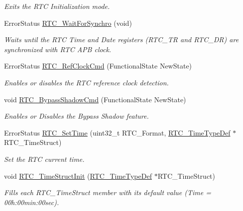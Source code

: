 \begin{DoxyCompactItemize}
\begin{DoxyCompactList}\small\item\em Exits the R\-T\-C Initialization mode. \end{DoxyCompactList}\item 
Error\-Status \hyperlink{group___r_t_c_ga2938febeef6baf0d91cc066ca5caf095}{R\-T\-C\-\_\-\-Wait\-For\-Synchro} (void)
\begin{DoxyCompactList}\small\item\em Waits until the R\-T\-C Time and Date registers (R\-T\-C\-\_\-\-T\-R and R\-T\-C\-\_\-\-D\-R) are synchronized with R\-T\-C A\-P\-B clock. \end{DoxyCompactList}\item 
Error\-Status \hyperlink{group___r_t_c_gaa60079ec257fb3a277d058ca8305533d}{R\-T\-C\-\_\-\-Ref\-Clock\-Cmd} (Functional\-State New\-State)
\begin{DoxyCompactList}\small\item\em Enables or disables the R\-T\-C reference clock detection. \end{DoxyCompactList}\item 
void \hyperlink{group___r_t_c_gae5e7c682f15b8ae9ddd3b2a85a9df7db}{R\-T\-C\-\_\-\-Bypass\-Shadow\-Cmd} (Functional\-State New\-State)
\begin{DoxyCompactList}\small\item\em Enables or Disables the Bypass Shadow feature. \end{DoxyCompactList}\item 
Error\-Status \hyperlink{group___r_t_c_ga9f9df80cfa82f7a4dd9f4d0cf2ffb3a6}{R\-T\-C\-\_\-\-Set\-Time} (uint32\-\_\-t R\-T\-C\-\_\-\-Format, \hyperlink{struct_r_t_c___time_type_def}{R\-T\-C\-\_\-\-Time\-Type\-Def} $\ast$R\-T\-C\-\_\-\-Time\-Struct)
\begin{DoxyCompactList}\small\item\em Set the R\-T\-C current time. \end{DoxyCompactList}\item 
void \hyperlink{group___r_t_c_ga0404db6e0c70e5a6bbbe4fa58a577365}{R\-T\-C\-\_\-\-Time\-Struct\-Init} (\hyperlink{struct_r_t_c___time_type_def}{R\-T\-C\-\_\-\-Time\-Type\-Def} $\ast$R\-T\-C\-\_\-\-Time\-Struct)
\begin{DoxyCompactList}\small\item\em Fills each R\-T\-C\-\_\-\-Time\-Struct member with its default value (Time = 00h\-:00min\-:00sec). \end{DoxyCompactList}\item 

\end{DoxyCompactItemize}
